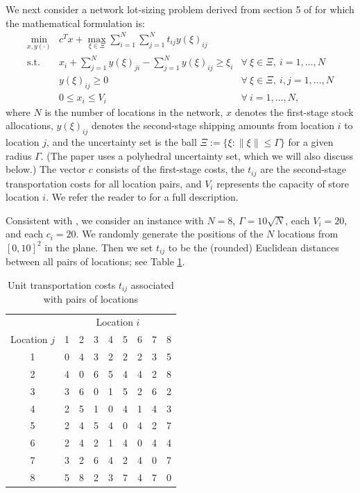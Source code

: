 \documentclass[12pt]{article}
\DeclareMathOperator{\st}{s.t.}
\begin{document}
\begin{onehalfspace}
We next consider a network lot-sizing problem derived from section 5 of
\cite{Bertsimas.Ruiter.2016} for which the mathematical formulation is:
\[
\begin{array}{lll}
\min \limits_{x, y(\cdot)} & c^Tx + \max \limits_{\xi \in \Xi}
    \sum_{i=1}^N \sum_{j=1}^N t_{ij}y(\xi)_{ij} & \\
\st & x_i + \sum_{j=1}^N y(\xi)_{ji} - \sum_{j=1}^Ny(\xi)_{ij} \ge \xi_i &
        \forall \ \xi \in \Xi, \ i=1, \ldots, N \\
    & y(\xi)_{ij} \ge 0 & \forall \ \xi \in \Xi, \ i, j = 1, \ldots, N \\
    & 0 \le x_i \le V_i & \forall \ i = 1, \ldots, N,
\end{array}
\]
where $N$ is the number of locations in the network, $x$ denotes the
first-stage stock allocations, $y(\xi)_{ij}$ denotes the second-stage
shipping amounts from location $i$ to location $j$, and the uncertainty
set is the ball $\Xi := \{\xi : \|\xi\| \le \Gamma \}$ for a given
radius $\Gamma$. (The paper \cite{Bertsimas.Ruiter.2016} uses a
polyhedral uncertainty set, which we will also discuss below.) The
vector $c$ consists of the first-stage costs, the $t_{ij}$ are the
second-stage transportation costs for all location pairs, and $V_i$
represents the capacity of store location $i$. We refer the reader to
\cite{Bertsimas.Ruiter.2016} for a full description.

Consistent with \cite{Bertsimas.Ruiter.2016}, we consider an instance
with $N=8$, $\Gamma = 10\sqrt{N}$, each $V_i=20$, and each $c_i = 20$.
We randomly generate the positions of the $N$ locations from $[0,
10]^2$ in the plane. Then we set $t_{ij}$ to be the (rounded) Euclidean
distances between all pairs of locations; see Table \ref{Tab:cost}. 

\begin{table}[tbp]
\centering
\begin{tabular}{c|cccccccc}  %
& \multicolumn{8}{c}{Location $i$} \\
Location $j$ & 1 & 2 & 3 & 4 & 5 & 6 & 7 & 8   \\ \hline
1 & 0 & 4 & 3 & 2 & 2 & 2 & 3 & 5  \\ 
2 & 4 & 0 & 6 & 5 & 4 & 4 & 2 & 8  \\
3 & 3 & 6 & 0 & 1 & 5 & 2 & 6 & 2  \\ 
4 & 2 & 5 & 1 & 0 & 4 & 1 & 4 & 3 \\
5 & 2 & 4 & 5 & 4 & 0 & 4 & 2 & 7 \\ 
6 & 2 & 4 & 2 & 1 & 4 & 0 & 4 & 4  \\ 
7 & 3 & 2 & 6 & 4 & 2 & 4 & 0 & 7  \\ 
8 & 5 & 8 & 2 & 3 & 7 & 4 & 7 & 0 
\end{tabular}
\caption{Unit transportation costs $t_{ij}$ associated with pairs of locations}
\label{Tab:cost}
\end{table}


\end{onehalfspace}
\end{document}
